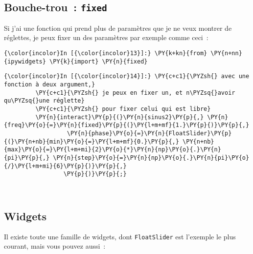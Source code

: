     \hypertarget{bouche-trou-fixed}{%
\subsection{\texorpdfstring{Bouche-trou~:
\texttt{fixed}}{Bouche-trou~: fixed}}\label{bouche-trou-fixed}}

    Si j'ai une fonction qui prend plus de paramètres que je ne veux montrer
de réglettes, je peux fixer un des paramètres par exemple comme ceci~:

    \begin{Verbatim}[commandchars=\\\{\},frame=single,framerule=0.3mm,rulecolor=\color{cellframecolor}]
{\color{incolor}In [{\color{incolor}13}]:} \PY{k+kn}{from} \PY{n+nn}{ipywidgets} \PY{k}{import} \PY{n}{fixed}
\end{Verbatim}


    \begin{Verbatim}[commandchars=\\\{\},frame=single,framerule=0.3mm,rulecolor=\color{cellframecolor}]
{\color{incolor}In [{\color{incolor}14}]:} \PY{c+c1}{\PYZsh{} avec une fonction à deux argument,}
         \PY{c+c1}{\PYZsh{} je peux en fixer un, et n\PYZsq{}avoir qu\PYZsq{}une réglette}
         \PY{c+c1}{\PYZsh{} pour fixer celui qui est libre}
         \PY{n}{interact}\PY{p}{(}\PY{n}{sinus2}\PY{p}{,} \PY{n}{freq}\PY{o}{=}\PY{n}{fixed}\PY{p}{(}\PY{l+m+mf}{1.}\PY{p}{)}\PY{p}{,}
                  \PY{n}{phase}\PY{o}{=}\PY{n}{FloatSlider}\PY{p}{(}\PY{n+nb}{min}\PY{o}{=}\PY{l+m+mf}{0.}\PY{p}{,} \PY{n+nb}{max}\PY{o}{=}\PY{l+m+mi}{2}\PY{o}{*}\PY{n}{np}\PY{o}{.}\PY{n}{pi}\PY{p}{,} \PY{n}{step}\PY{o}{=}\PY{n}{np}\PY{o}{.}\PY{n}{pi}\PY{o}{/}\PY{l+m+mi}{6}\PY{p}{)}\PY{p}{,}
                 \PY{p}{)}\PY{p}{;}
\end{Verbatim}


    \begin{center}
    \end{center}
    { \hspace*{\fill} \\}
    
    \hypertarget{widgets}{%
\subsection{Widgets}\label{widgets}}

    Il existe toute une famille de widgets, dont \texttt{FloatSlider} est
l'exemple le plus courant, mais vous pouvez aussi~:

